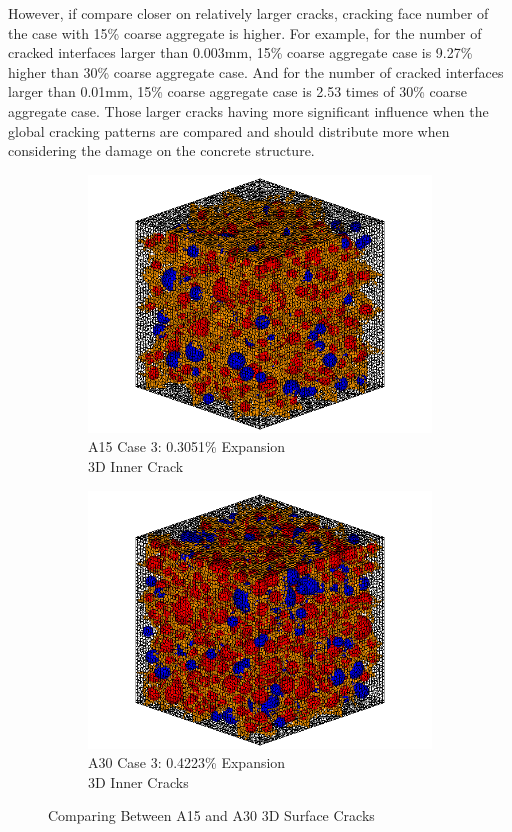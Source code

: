 However, if compare closer on relatively larger cracks, cracking face number of the case with 15\% coarse aggregate is higher. For example, for the number of cracked interfaces larger than 0.003mm, 15\% coarse aggregate case is 9.27\% higher than 30\% coarse aggregate case. And for the number of cracked interfaces larger than 0.01mm, 15\% coarse aggregate case is 2.53 times of 30\% coarse aggregate case.  Those larger cracks having more significant influence when the global cracking patterns are compared and should distribute more when considering the damage on the concrete structure.
\begin{figure}[h!]
\centering

    \begin{subfigure}{.5\textwidth}
      \centering
      \includegraphics[width=.8\linewidth]{Files/exp_3D/ASR/A15P75_3_c.png}
    \caption{A15 Case 3: 0.3051\% Expansion \\ 3D Inner Crack}
    \end{subfigure}%
    \begin{subfigure}{.5\textwidth}
      \centering
      \includegraphics[width=.8\linewidth]{Files/exp_3D/ASR/A30P75_3_c.png}
    \caption{A30 Case 3: 0.4223\% Expansion \\ 3D Inner Cracks}
    \end{subfigure}

  \caption{Comparing Between A15 and A30 3D Surface Cracks}
  \label{fig:ASR_A15vsA30P75_3D}
\end{figure}
